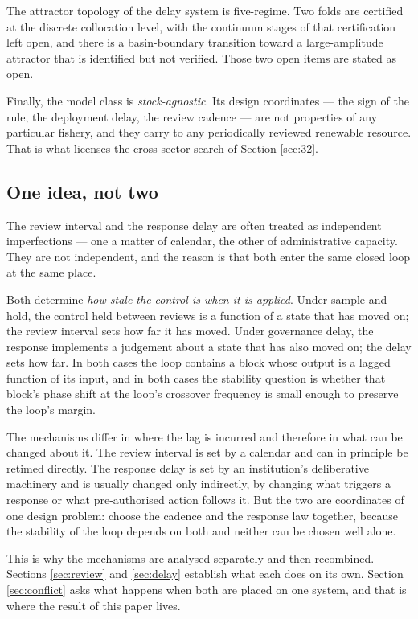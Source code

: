 The attractor topology of the delay system is five-regime. Two folds are certified at the
discrete collocation level, with the continuum stages of that certification left open, and
there is a basin-boundary transition toward a large-amplitude attractor that is identified
but not verified. Those two open items are stated as open.

Finally, the model class is \emph{stock-agnostic}. Its design coordinates --- the sign of
the rule, the deployment delay, the review cadence --- are not properties of any
particular fishery, and they carry to any periodically reviewed renewable resource. That
is what licenses the cross-sector search of Section \ref{sec:32}.

\subsection{One idea, not two}
\label{sec:oneidea}

The review interval and the response delay are often treated as independent
imperfections --- one a matter of calendar, the other of administrative capacity. They are
not independent, and the reason is that both enter the same closed loop at the same place.

Both determine \emph{how stale the control is when it is applied}. Under sample-and-hold,
the control held between reviews is a function of a state that has moved on; the review
interval sets how far it has moved. Under governance delay, the response implements a
judgement about a state that has also moved on; the delay sets how far. In both cases the
loop contains a block whose output is a lagged function of its input, and in both cases
the stability question is whether that block's phase shift at the loop's crossover
frequency is small enough to preserve the loop's margin.

The mechanisms differ in where the lag is incurred and therefore in what can be changed
about it. The review interval is set by a calendar and can in principle be retimed
directly. The response delay is set by an institution's deliberative machinery and is
usually changed only indirectly, by changing what triggers a response or what
pre-authorised action follows it. But the two are coordinates of one design problem:
choose the cadence and the response law together, because the stability of the loop
depends on both and neither can be chosen well alone.

This is why the mechanisms are analysed separately and then recombined. Sections
\ref{sec:review} and \ref{sec:delay} establish what each does on its own. Section
\ref{sec:conflict} asks what happens when both are placed on one system, and that is where
the result of this paper lives.

